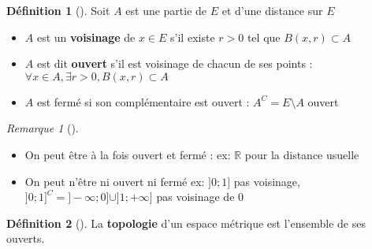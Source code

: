 \documentclass{article}
\theoremstyle{plain}%
\theoremstyle{definition}
\newtheorem{defn}{Définition}[section]
\theoremstyle{remark}
\newtheorem*{rem}{Remarque}
\begin{document}
\begin{defn}[]
    Soit $ A $ est une partie de $ E $ et d'une distance sur $ E $ \begin{itemize}
        \item $ A $ est un \textbf{voisinage} de $ x \in E $ s'il existe $ r>0 $ tel que $ B(x,r) \subset A $ 
        \item $ A $ est dit \textbf{ouvert} s'il est voisinage de chacun de ses points : $ \forall x \in A, \exists r>0, B(x,r) \subset A $ 
        \item $ A $ est fermé si son complémentaire est ouvert : $ A^C = E \setminus A $ ouvert 
    \end{itemize}
    \begin{rem}[]
        \begin{itemize}
            \item On peut être à la fois ouvert et fermé : ex: $ \mathbb{R} $ pour la distance usuelle
            \item On peut n'être ni ouvert ni fermé ex: $ ]0;1] $ pas voisinage, $ ]0;1]^C = ]-\infty ;0] \cup ]1;+\infty ] $ pas voisinage de 0
        \end{itemize}
    \end{rem}
\end{defn}
\begin{defn}[]
    La \textbf{topologie} d'un espace métrique est l'ensemble de ses ouverts. 
\end{defn}
\end{document}

